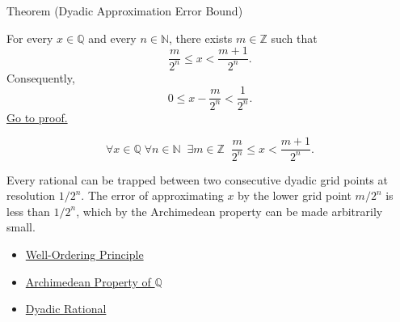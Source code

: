 \begin{theorembox}{Theorem (Dyadic Approximation Error Bound)}
\begin{theorem}
\label{thm:dyadic-approximation-error-bound}
For every $x\in\mathbb{Q}$ and every $n\in\mathbb{N}$, there exists
$m\in\mathbb{Z}$ such that
\[
\frac{m}{2^n}\le x<\frac{m+1}{2^n}.
\]
Consequently,
\[
0\le x-\frac{m}{2^n}<\frac{1}{2^n}.
\]
\hyperref[prf:dyadic-approximation-error-bound]{Go to proof.}
\end{theorem}
\end{theorembox}

\begin{remark*}
\[
\forall x\in\mathbb{Q}\;\forall n\in\mathbb{N}\;\;
\exists m\in\mathbb{Z}\;\;
\frac{m}{2^n}\le x < \frac{m+1}{2^n}.
\]
\end{remark*}

\begin{remark*}[Interpretation]
Every rational can be trapped between two consecutive dyadic grid points at
resolution $1/2^n$. The error of approximating $x$ by the lower grid point
$m/2^n$ is less than $1/2^n$, which by the Archimedean property can be made
arbitrarily small.
\end{remark*}

\begin{dependencies}
\begin{itemize}
  \item \hyperref[thm:well-ordering-principle]{Well-Ordering Principle}
  \item \hyperref[thm:archimedean-q]{Archimedean Property of $\mathbb{Q}$}
  \item \hyperref[def:dyadic-rational]{Dyadic Rational}
\end{itemize}
\end{dependencies}
